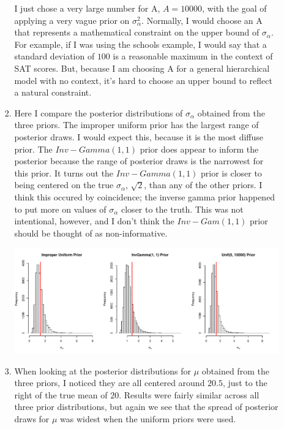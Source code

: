\documentclass[12pt]{article}\usepackage[]{graphicx}\usepackage[]{color}
\newenvironment{knitrout}{}{} %
\begin{document}
\begin{doublespacing}
\begin{enumerate}
\begin{enumerate}
\begin{enumerate}
\begin{center}
\begin{knitrout}
\end{knitrout}
\end{center}
I just chose a very large number for A, $A=10000$, with the goal of applying a very vague prior on $\sigma^2_{\alpha}$. Normally, I would choose an A that represents a mathematical constraint on the upper bound of $\sigma_{\alpha}$. For example, if I was using the schools example, I would say that a standard deviation of $100$ is a reasonable maximum in the context of SAT scores. But, because I am choosing A for a general hierarchical model with no context, it's hard to choose an upper bound to reflect a natural constraint.









\item Here I compare the posterior distributions of $\sigma_{\alpha}$ obtained from the three priors. The improper uniform prior has the largest range of posterior draws. I would expect this, because it is the most diffuse prior. The $Inv-Gamma(1, 1)$ prior does appear to inform the posterior because the range of posterior draws is the narrowest for this prior. It turns out the $Inv-Gamma(1,1)$ prior is closer to being centered on the true $\sigma_{\alpha}$, $\sqrt{2}$, than any of the other priors. I think this occured by coincidence; the inverse gamma prior happened to put more on values of $\sigma_{\alpha}$ closer to the truth. This was not intentional, however, and I don't think the $Inv-Gam(1,1)$ prior should be thought of as non-informative.

\begin{knitrout}\footnotesize
{}\color{fgcolor}
\includegraphics[width=\linewidth]{figure/plotpost} 

\end{knitrout}

\item When looking at the posterior distributions for $\mu$ obtained from the three priors, I noticed they are all centered around $20.5$, just to the right of the true mean of $20$. Results were fairly similar across all three prior distributions, but again we see that the spread of posterior draws for $\mu$ was widest when the uniform priors were used.


\end{enumerate}
\end{enumerate}
\end{enumerate}
\end{doublespacing}
\end{document}
